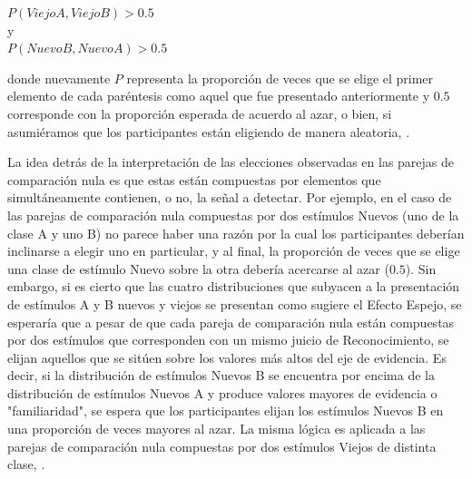 \begin{itemize}
\begin{center}
$P(ViejoA, ViejoB) > 0.5$\\
y\\
$P(NuevoB, NuevoA) > 0.5$\\
\end{center}
\begin{center}
donde nuevamente $P$ representa la proporción de veces que se elige el primer elemento de cada paréntesis como aquel que fue presentado anteriormente y $0.5$ corresponde con la proporción esperada de acuerdo al azar, o bien, si asumiéramos que los participantes están eligiendo de manera aleatoria, \parencite{Glanzer1993}.\\ 
\end{center}

La idea detrás de la interpretación de las elecciones observadas en las parejas de comparación nula es que estas están compuestas por elementos que simultáneamente contienen, o no, la señal a detectar. Por ejemplo, en el caso de las parejas de comparación nula compuestas por dos estímulos Nuevos (uno de la clase A y uno B) no parece haber una razón por la cual los participantes deberían inclinarse a elegir uno en particular, y al final, la proporción de veces que se elige una clase de estímulo Nuevo sobre la otra debería acercarse al azar ($0.5$). Sin embargo, si es cierto que las cuatro distribuciones que subyacen a la presentación de estímulos A y B nuevos y viejos se presentan como sugiere el Efecto Espejo, se esperaría que a pesar de que cada pareja de comparación nula están compuestas por dos estímulos que corresponden con un mismo juicio de Reconocimiento, se elijan aquellos que se sitúen sobre los valores más altos del eje de evidencia. Es decir, si la distribución de estímulos Nuevos B se encuentra por encima de la distribución de estímulos Nuevos A y produce valores mayores de evidencia o "familiaridad", se espera que los participantes elijan los estímulos Nuevos B en una proporción de veces mayores al azar. La misma lógica es aplicada a las parejas de comparación nula compuestas por dos estímulos Viejos de distinta clase, \parencite{Glanzer1993}.\\

\end{itemize}

